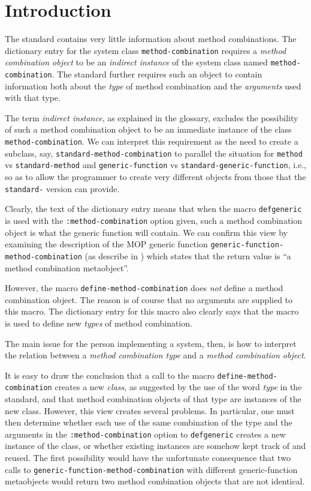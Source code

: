 \section{Introduction}

The \commonlisp{} standard \cite{ansi:common:lisp} contains very
little information about method combinations.  The dictionary entry
for the system class \texttt{method-combination} requires a
\emph{method combination object} to be an \emph{indirect instance} of
the system class named \texttt{method-combination}.  The standard
further requires such an object to contain information both about the
\emph{type} of method combination and the \emph{arguments} used with
that type.

The term \emph{indirect instance}, as explained in the glossary,
excludes the possibility of such a method combination object to be an
immediate instance of the class \texttt{method-combination}.  We can
interpret this requirement as the need to create a subclass, say,
\texttt{standard-method-combination} to parallel the situation for
\texttt{method} vs \texttt{standard-method} and
\texttt{generic-function} vs \texttt{standard-generic-function}, i.e.,
so as to allow the programmer to create very different objects from
those that the \texttt{standard-} version can provide.

Clearly, the text of the dictionary entry means that when the macro
\texttt{defgeneric} is used with the \texttt{:method-combination}
option given, such a method combination object is what the generic
function will contain.  We can confirm this view by examining the
description of the MOP generic function
\texttt{generic-function-method-combination} (as describe in
\cite{Kiczales:1991:AMP:574212}) which states that the return value is
``a method combination metaobject''.

However, the macro \texttt{define-method-combination} does \emph{not}
define a method combination object.  The reason is of course that no
arguments are supplied to this macro.  The dictionary entry for this
macro also clearly says that the macro is used to define new
\emph{types} of method combination.

The main issue for the person implementing a \commonlisp{} system,
then, is how to interpret the relation between a \emph{method
  combination type} and a \emph{method combination object}.

It is easy to draw the conclusion that a call to the macro
\texttt{define-method-combination} creates a new \emph{class}, as
suggested by the use of the word \emph{type} in the standard, and that
method combination objects of that type are instances of the new
class.  However, this view creates several problems.  In particular,
one must then determine whether each use of the same combination of
the type and the arguments in the \texttt{:method-combination} option
to \texttt{defgeneric} creates a new instance of the class, or whether
existing instances are somehow kept track of and reused.  The first
possibility would have the unfortunate consequence that two calls to
\texttt{generic-function-method-combination} with different
generic-function metaobjects would return two method combination
objects that are not identical.

